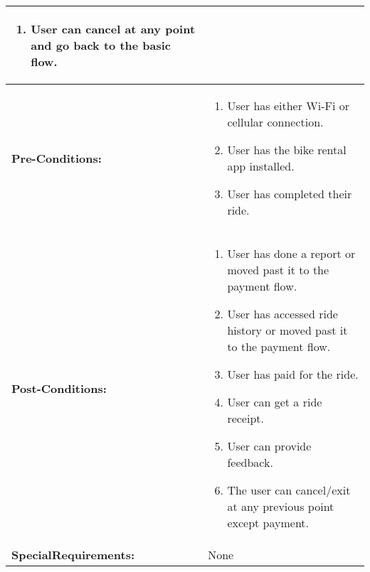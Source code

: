 \begin{longtable}{|p{3cm}|p{3cm}|p{3cm}|p{3cm}|}
{\begin{enumerate}[topsep=0pt,itemsep=0pt,parsep=0pt,partopsep=0pt,leftmargin=12pt]
        \item User can cancel at any point and go back to the basic flow.
    \end{enumerate}
} \\
\hline
\textbf{Pre-Conditions:} & \multicolumn{3}{p{9cm}|}{
    \begin{enumerate}[topsep=0pt,itemsep=0pt,parsep=0pt,partopsep=0pt,leftmargin=12pt]
        \item User has either Wi-Fi or cellular connection.
        \item User has the bike rental app installed.
        \item User has completed their ride.
    \end{enumerate}
}\\
\hline
\textbf{Post-Conditions:} & \multicolumn{3}{p{9cm}|}{
    \begin{enumerate}[topsep=0pt,itemsep=0pt,parsep=0pt,partopsep=0pt,leftmargin=12pt]
        \item User has done a report or moved past it to the payment flow.
        \item User has accessed ride history or moved past it to the payment flow.
        \item User has paid for the ride.
        \item User can get a ride receipt.
        \item User can provide feedback.
        \item The user can cancel/exit at any previous point except payment. 
    \end{enumerate}
}\\
\hline
\textbf{Special\newline Requirements:} & \multicolumn{3}{l|}{None}\\
\hline
\end{longtable}


\normalsize
